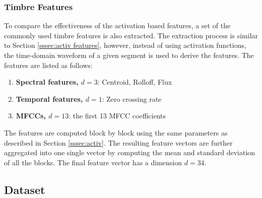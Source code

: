 \documentclass{article}
\begin{document}
\subsubsection{Timbre Features}
\label{sssec:timbre features}
To compare the effectiveness of the activation based features, a set of the commonly used timbre features is also extracted. The extraction process is similar to Section \ref{sssec:activ features}, however, instead of using activation functions, the time-domain waveform of a given segment is used to derive the features. The features are listed as follows: 

\begin{enumerate}
	\item \textbf{Spectral features, $d = 3$}: Centroid, Rolloff, Flux
	\item \textbf{Temporal features, $d = 1$}: Zero crossing rate
	\item \textbf{MFCCs, $d = 13$}: the first 13 MFCC coefficients
\end{enumerate}

The features are computed block by block using the same parameters as described in Section \ref{sssec:activ}. The resulting feature vectors are further aggregated into one single vector by computing the mean and standard deviation of all the blocks. The final feature vector has a dimension $d = 34$. 

%

\subsection{Dataset}
\end{document}
